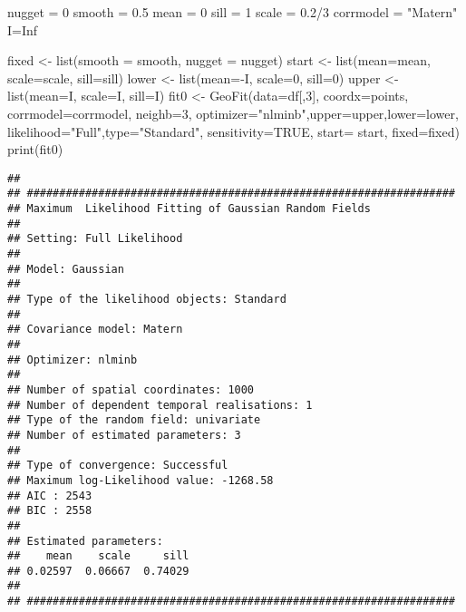 \documentclass[
]{article}
\newenvironment{Shaded}{\begin{snugshade}}{\end{snugshade}}
\newcommand{\AttributeTok}[1]{\textcolor[rgb]{0.77,0.63,0.00}{#1}}
\newcommand{\ConstantTok}[1]{\textcolor[rgb]{0.00,0.00,0.00}{#1}}
\newcommand{\DecValTok}[1]{\textcolor[rgb]{0.00,0.00,0.81}{#1}}
\newcommand{\FloatTok}[1]{\textcolor[rgb]{0.00,0.00,0.81}{#1}}
\newcommand{\FunctionTok}[1]{\textcolor[rgb]{0.00,0.00,0.00}{#1}}
\newcommand{\NormalTok}[1]{#1}
\newcommand{\OtherTok}[1]{\textcolor[rgb]{0.56,0.35,0.01}{#1}}
\newcommand{\SpecialCharTok}[1]{\textcolor[rgb]{0.00,0.00,0.00}{#1}}
\newcommand{\StringTok}[1]{\textcolor[rgb]{0.31,0.60,0.02}{#1}}
\begin{document}
\begin{Shaded}
\begin{Highlighting}[]
\NormalTok{nugget }\OtherTok{=} \DecValTok{0}
\NormalTok{smooth }\OtherTok{=} \FloatTok{0.5}
\NormalTok{mean }\OtherTok{=} \DecValTok{0}
\NormalTok{sill }\OtherTok{=} \DecValTok{1}
\NormalTok{scale }\OtherTok{=} \FloatTok{0.2}\SpecialCharTok{/}\DecValTok{3}
\NormalTok{corrmodel }\OtherTok{=} \StringTok{"Matern"}
\NormalTok{I}\OtherTok{=}\ConstantTok{Inf}

\NormalTok{fixed }\OtherTok{\textless{}{-}} \FunctionTok{list}\NormalTok{(}\AttributeTok{smooth =}\NormalTok{ smooth, }\AttributeTok{nugget =}\NormalTok{ nugget)}
\NormalTok{start }\OtherTok{\textless{}{-}} \FunctionTok{list}\NormalTok{(}\AttributeTok{mean=}\NormalTok{mean, }\AttributeTok{scale=}\NormalTok{scale, }\AttributeTok{sill=}\NormalTok{sill)}
\NormalTok{lower }\OtherTok{\textless{}{-}} \FunctionTok{list}\NormalTok{(}\AttributeTok{mean=}\SpecialCharTok{{-}}\NormalTok{I, }\AttributeTok{scale=}\DecValTok{0}\NormalTok{, }\AttributeTok{sill=}\DecValTok{0}\NormalTok{)}
\NormalTok{upper }\OtherTok{\textless{}{-}} \FunctionTok{list}\NormalTok{(}\AttributeTok{mean=}\NormalTok{I, }\AttributeTok{scale=}\NormalTok{I, }\AttributeTok{sill=}\NormalTok{I)}
\NormalTok{fit0  }\OtherTok{\textless{}{-}} \FunctionTok{GeoFit}\NormalTok{(}\AttributeTok{data=}\NormalTok{df[,}\DecValTok{3}\NormalTok{], }\AttributeTok{coordx=}\NormalTok{points, }\AttributeTok{corrmodel=}\NormalTok{corrmodel, }\AttributeTok{neighb=}\DecValTok{3}\NormalTok{,}
                    \AttributeTok{optimizer=}\StringTok{"nlminb"}\NormalTok{,}\AttributeTok{upper=}\NormalTok{upper,}\AttributeTok{lower=}\NormalTok{lower,}
                    \AttributeTok{likelihood=}\StringTok{"Full"}\NormalTok{,}\AttributeTok{type=}\StringTok{"Standard"}\NormalTok{, }\AttributeTok{sensitivity=}\ConstantTok{TRUE}\NormalTok{,}
                    \AttributeTok{start=}\NormalTok{ start, }\AttributeTok{fixed=}\NormalTok{fixed)}
\FunctionTok{print}\NormalTok{(fit0)}
\end{Highlighting}
\end{Shaded}

\begin{verbatim}
## 
## ##################################################################
## Maximum  Likelihood Fitting of Gaussian Random Fields
## 
## Setting: Full Likelihood 
## 
## Model: Gaussian 
## 
## Type of the likelihood objects: Standard 
## 
## Covariance model: Matern 
## 
## Optimizer: nlminb 
## 
## Number of spatial coordinates: 1000 
## Number of dependent temporal realisations: 1 
## Type of the random field: univariate 
## Number of estimated parameters: 3 
## 
## Type of convergence: Successful 
## Maximum log-Likelihood value: -1268.58
## AIC : 2543 
## BIC : 2558 
## 
## Estimated parameters:
##    mean    scale     sill  
## 0.02597  0.06667  0.74029  
## 
## ##################################################################
\end{verbatim}
\end{document}
